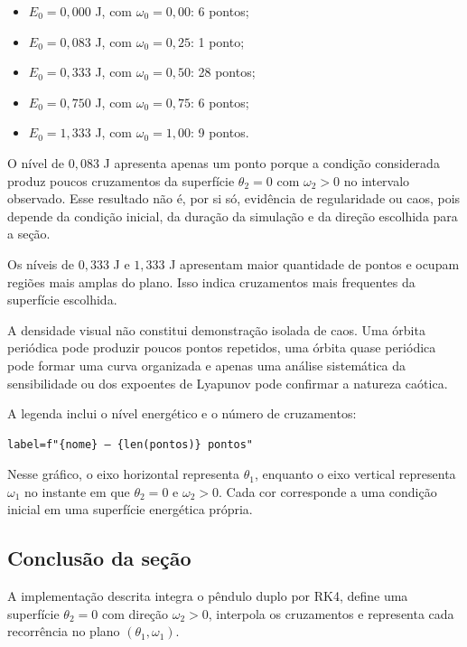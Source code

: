 \documentclass[12pt,a4paper]{article}
\begin{document}
\begin{itemize}
    \item $E_0=0{,}000$ J, com $\omega_0=0{,}00$: 6 pontos;
    \item $E_0=0{,}083$ J, com $\omega_0=0{,}25$: 1 ponto;
    \item $E_0=0{,}333$ J, com $\omega_0=0{,}50$: 28 pontos;
    \item $E_0=0{,}750$ J, com $\omega_0=0{,}75$: 6 pontos;
    \item $E_0=1{,}333$ J, com $\omega_0=1{,}00$: 9 pontos.
\end{itemize}

O nível de $0{,}083$ J apresenta apenas um ponto porque a condição considerada produz poucos cruzamentos da superfície $\theta_2=0$ com $\omega_2>0$ no intervalo observado. Esse resultado não é, por si só, evidência de regularidade ou caos, pois depende da condição inicial, da duração da simulação e da direção escolhida para a seção.

Os níveis de $0{,}333$ J e $1{,}333$ J apresentam maior quantidade de pontos e ocupam regiões mais amplas do plano. Isso indica cruzamentos mais frequentes da superfície escolhida.

A densidade visual não constitui demonstração isolada de caos. Uma órbita periódica pode produzir poucos pontos repetidos, uma órbita quase periódica pode formar uma curva organizada e apenas uma análise sistemática da sensibilidade ou dos expoentes de Lyapunov pode confirmar a natureza caótica.

A legenda inclui o nível energético e o número de cruzamentos:

\begin{lstlisting}
label=f"{nome} — {len(pontos)} pontos"
\end{lstlisting}

Nesse gráfico, o eixo horizontal representa $\theta_1$, enquanto o eixo vertical representa $\omega_1$ no instante em que $\theta_2=0$ e $\omega_2>0$. Cada cor corresponde a uma condição inicial em uma superfície energética própria.

\subsection{Conclusão da seção}

A implementação descrita integra o pêndulo duplo por RK4, define uma superfície $\theta_2=0$ com direção $\omega_2>0$, interpola os cruzamentos e representa cada recorrência no plano $(\theta_1,\omega_1)$.
\end{document}
